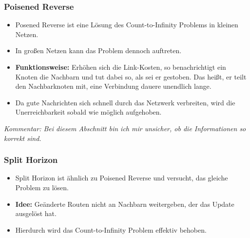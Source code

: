 \documentclass[a4paper, 11pt, accentcolor = tud3b]{tudreport}
\begin{document}
                \subsubsection{Poisened Reverse}
                    \begin{itemize}
                    	\item Posened Reverse ist eine Lösung des Count-to-Infinity Problems in kleinen Netzen.
                    	\item In großen Netzen kann das Problem dennoch auftreten.
                    	\item \textbf{Funktionsweise:} Erhöhen sich die Link-Kosten, so benachrichtigt ein Knoten die Nachbarn und tut dabei so, als sei er gestoben. Das heißt, er teilt den Nachbarknoten mit, eine Verbindung dauere unendlich lange.
                    	\item Da gute Nachrichten sich schnell durch das Netzwerk verbreiten, wird die Unerreichbarkeit sobald wie möglich aufgehoben.
                    \end{itemize}
                    
                    \textit{Kommentar: Bei diesem Abschnitt bin ich mir unsicher, ob die Informationen so korrekt sind.} 

                \subsubsection{Split Horizon}
	                \begin{itemize}
	                	\item Split Horizon ist ähnlich zu Poisened Reverse und versucht, das gleiche Problem zu lösen.
	                	\item \textbf{Idee:} Geänderte Routen nicht an Nachbarn weitergeben, der das Update ausgelöst hat.
	                	\item Hierdurch wird das Count-to-Infinity Problem effektiv behoben.
	                \end{itemize}
\end{document}
